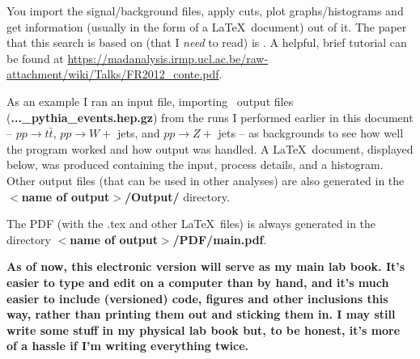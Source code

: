 You import the signal/background files, apply cuts, plot graphs/histograms and get information (usually in the form of a \LaTeX\ document) out of it. The paper that this search is based on (that I \emph{need} to read) is \cite{ATLAS-CONF-2016-019}. A helpful, brief tutorial can be found at \url{https://madanalysis.irmp.ucl.ac.be/raw-attachment/wiki/Talks/FR2012_conte.pdf}.

As an example I ran an input file, importing \madgraph\ output files (\textbf{...\_pythia\_events.hep.gz}) from the runs I performed earlier in this document -- $pp \rightarrow t\bar{t}$, $pp \rightarrow W +$ jets, and $pp \rightarrow Z +$ jets -- as backgrounds to see how well the program worked and how output was handled. A \LaTeX\ document, displayed below, was produced containing the input, process details, and a histogram. Other output files (that can be used in other analyses) are also generated in the \textbf{$<$name of output$>$/Output/} directory.



The PDF (with the .tex and other \LaTeX\ files) is always generated in the directory \textbf{$<$name of output$>$/PDF/main.pdf}.

\textbf{As of now, this electronic version will serve as my main lab book. It's easier to type and edit on a computer than by hand, and it's much easier to include (versioned) code, figures and other inclusions this way, rather than printing them out and sticking them in. I may still write some stuff in my physical lab book but, to be honest, it's more of a hassle if I'm writing everything twice.}
